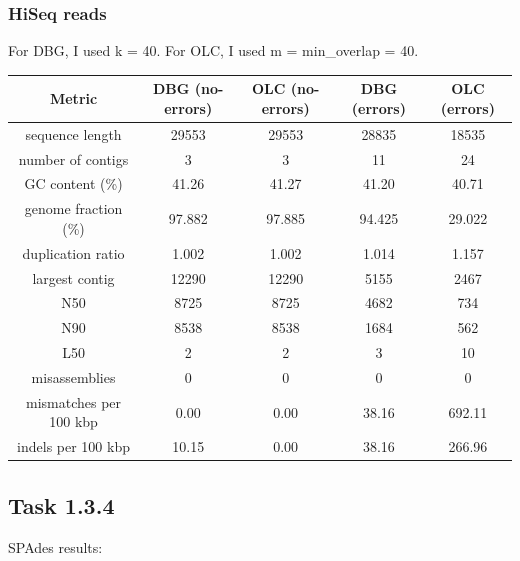 \documentclass[12pt]{article}
\begin{document}
\subsubsection{HiSeq reads}
For DBG, I used k = 40. For OLC, I used m = min\_overlap = 40.


\begin{center}
\begin{tabular}{ |c|c|c||c|c| }
    \hline
    Metric & DBG (no-errors) & OLC (no-errors) & DBG (errors) & OLC (errors) \\
    \hline
    sequence length        & 29553  & 29553  & 28835 & 18535 \\
    number of contigs      & 3      & 3      & 11 & 24 \\
    GC content (\%)        & 41.26  & 41.27  & 41.20 & 40.71 \\
    genome fraction (\%)   & 97.882 & 97.885 & 94.425 & 29.022 \\
    duplication ratio      & 1.002  & 1.002  & 1.014 & 1.157 \\
    largest contig         & 12290  & 12290  & 5155 & 2467 \\
    N50                    & 8725   & 8725   & 4682 & 734 \\
    N90                    & 8538   & 8538   & 1684 & 562 \\
    L50                    & 2      & 2      & 3 & 10 \\
    misassemblies          & 0      & 0 & 0  & 0 \\
    mismatches per 100 kbp & 0.00   & 0.00   & 38.16 & 692.11 \\
    indels per 100 kbp     & 10.15  & 0.00   & 38.16 & 266.96 \\
    \hline
\end{tabular}
\end{center}

\subsection{Task 1.3.4}

SPAdes results:
\end{document}

